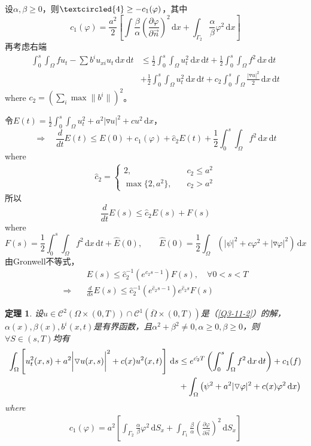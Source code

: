 \documentclass[11pt, a4paper]{article}
\theoremstyle{theorem}
\newtheorem{thm}{定理}[section]
\newcommand{\intd}[1]{\,\mathrm{d}{#1}}
\begin{document}
设$\alpha, \beta \geq 0$，则$\textcircled{4} \geq - c_1(\varphi)$，其中
$$
c_1(\varphi) = \frac{a^2}{2} \left[\int \frac{\beta}{\alpha} \left(\frac{\partial \varphi}{\partial \vec{n}}\right)^2 \intd x + \int_{\Gamma_2} \frac{\alpha}{\beta} \varphi^2 \intd x\right]
$$
再考虑右端
\begin{align*}
    \int_0^s \int_\Omega f u_t - \sum b^i u_{xi} u_t \intd x \intd t
    &\leq \frac{1}{2} \int_0^s \int_\Omega u_t^2 \intd x \intd t + \frac{1}{2} \int_0^s \int_\Omega f^2 \intd x \intd t \\
    &+ \frac{1}{2} \int_0^s \int_\Omega u_t^2 \intd x \intd t + c_2 \int_0^s \int_\Omega \frac{|\triangledown u|^2}{2} \intd x \intd t
\end{align*}
where $c_2 = (\sum_i \max \|b^i\|)^2$。

令$E(t) = \frac{1}{2} \int_0^s \int_\Omega u_t^2 + a^2 |\triangledown u|^2 + cu^2 \intd x$，
$$
\Longrightarrow \quad \frac{d}{d t} E(t) \leq E(0) + c_1(\varphi) + \hat{c}_2E(t) + \frac{1}{2} \int_0^s \int_\Omega f^2 \intd x \intd t
$$
where
\begin{align*}
    \hat{c}_2 =
    \begin{cases}
        2, \quad &c_2 \leq a^2 \\
        \max \{2, a^2\}, \quad & c_2 > a^2
    \end{cases}
\end{align*}
所以
$$
\frac{d}{d t} E(s) \leq \hat{c}_2 E(s) + F(s)
$$
where
$$
F(s) = \frac{1}{2} \int_0^s \int_\Omega f^2 \intd x \intd t + \hat{E}(0), \quad \quad \hat{E}(0) = \frac{1}{2} \int_\Omega \left(|\psi|^2 + c \varphi^2 + |\triangledown \varphi|^2 \right) \intd x
$$
由Gronwell不等式，
\begin{align*}
    &E(s) \leq \hat{c}_2^{-1} \left(e^{\hat{c}_2 s - 1}\right) F(s), \quad \forall 0 < s < T \\
    \Longrightarrow \quad & \frac{d}{d s} E(s) \leq \hat{c}_2^{-1} \left(e^{\hat{c}_2 s - 1}\right) e^{\hat{c}_2 s} F(s)
\end{align*}
\begin{thm}
设$u \in \mathcal{C}^2(\Omega \times (0,T)) \cap \mathcal{C}^1(\overline{\Omega}\times (0,T))$是（\ref{Q3-11-2}）的解，$\alpha(x), \beta(x), b^i(x,t)$是有界函数，且$\alpha^2 + \beta^2 \neq 0, \alpha \geq 0, \beta \geq 0$，则$\forall S \in (s,T)$均有
\begin{align}
    \int_\Omega \left[u_t^2(x,s) + a^2 \bigg| \triangledown u(x,s)\bigg|^2 + c(x)u^2(x,t) \right] \intd s
    &\leq e^{\hat{c_2}T} \left(\int_0^s \int_\Omega f^2 \intd x \intd t\right) + c_1(f) \notag \\
    &+ \int_\Omega \left(\psi^2 + a^2 |\triangledown \varphi|^2 + c(x) \varphi^2 \intd x\right)
\end{align}
where
\begin{align}
    c_1(\varphi) = a^2 \left[\int_{\Gamma_2}\frac{\alpha}{\beta}\varphi^2 \intd S_x + \int_{\Gamma_1} \frac{\beta}{\alpha} \left(\frac{\partial \varphi}{\partial \vec{n}}\right)^2 \intd S_x \right]
\end{align}
\end{thm}
\end{document}
